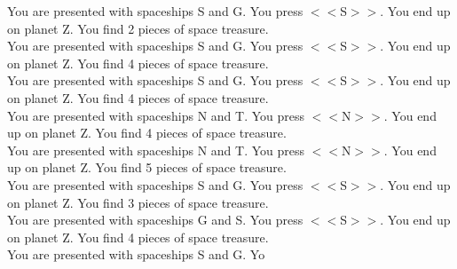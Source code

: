 \documentclass[pdflatex,sn-nature]{sn-jnl}%
\theoremstyle{thmstyleone}%
\theoremstyle{thmstyletwo}%
\theoremstyle{thmstylethree}%
\begin{document}
You are presented with spaceships S and G. You press $<<$S$>>$. You end up on planet Z. You find 2 pieces of space treasure. $~$\\ 
You are presented with spaceships S and G. You press $<<$S$>>$. You end up on planet Z. You find 4 pieces of space treasure. $~$\\ 
You are presented with spaceships S and G. You press $<<$S$>>$. You end up on planet Z. You find 4 pieces of space treasure. $~$\\ 
You are presented with spaceships N and T. You press $<<$N$>>$. You end up on planet Z. You find 4 pieces of space treasure. $~$\\ 
You are presented with spaceships N and T. You press $<<$N$>>$. You end up on planet Z. You find 5 pieces of space treasure. $~$\\ 
You are presented with spaceships S and G. You press $<<$S$>>$. You end up on planet Z. You find 3 pieces of space treasure. $~$\\ 
You are presented with spaceships G and S. You press $<<$S$>>$. You end up on planet Z. You find 4 pieces of space treasure. $~$\\ 
You are presented with spaceships S and G. Yo 
\end{document}

